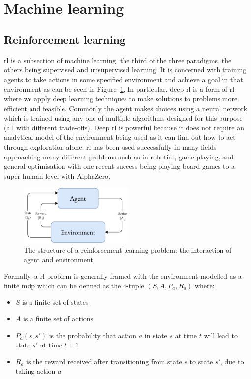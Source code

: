 \section{Machine learning}

\subsection{Reinforcement learning}

\Acl{rl}\cite{sutton2018reinforcement} is a subsection of machine learning, the third of the three paradigms, the others being supervised and unsupervised learning. It is concerned with training agents to take actions in some specified environment and achieve a goal in that environment as can be seen in Figure~\ref{fig:reinforcement_learning}. In particular, deep \ac{rl}\cite{MAL-071} is a form of \ac{rl} where we apply deep learning techniques to make solutions to problems more efficient and feasible. Commonly the agent makes choices using a neural network which is trained using any one of multiple algorithms designed for this purpose (all with different trade-offs). Deep \ac{rl} is powerful because it does not require an analytical model of the environment being used as it can find out how to act through exploration alone. \Ac{rl} has been used successfully in many fields approaching many different problems such as in robotics\cite{gavrilov2011mobile}, game-playing\cite{tesauro1995temporal}, and general optimisation with one recent success being playing board games to a super-human level with AlphaZero\cite{Silver1140}.

\begin{figure}
    \centering
    \includegraphics[width=0.5\textwidth]{figures/reinforcement_learning.pdf}
    \caption{The structure of a reinforcement learning problem: the interaction of agent and environment}
    \label{fig:reinforcement_learning}
\end{figure}

Formally, a \ac{rl} problem is generally framed with the environment modelled as a finite \ac{mdp} which can be defined as the 4-tuple $(S, A, P_a, R_a)$ where:
\begin{itemize}
    \item $S$ is a finite set of states
    \item $A$ is a finite set of actions
    \item $P_a(s,s')$ is the probability that action $a$ in state $s$ at time $t$ will lead to state $s'$ at time $t + 1$
    \item $R_a$ is the reward received after transitioning from state $s$ to state $s'$, due to taking action $a$
\end{itemize}

